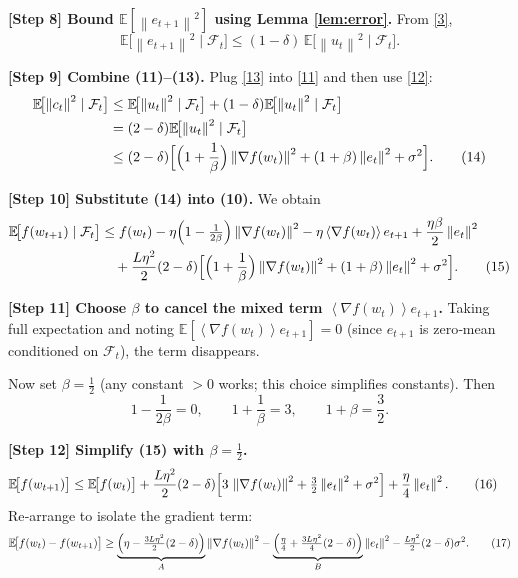 \documentclass{article}
\newcommand{\E}{\mathbb{E}}
\newcommand{\norm}[1]{\left\|#1\right\|}
\newcommand{\inner}[1]{\left\langle#1\right\rangle}
\begin{document}
\noindent\textbf{[Step 8] Bound $\E[\norm{e_{t+1}}^2]$ using Lemma \ref{lem:error}.}  
From \eqref{3},
\[
\E\!\bigl[\norm{e_{t+1}}^2\mid\mathcal{F}_t\bigr]\le (1-\delta)\,\E\!\bigl[\norm{u_t}^2\mid\mathcal{F}_t\bigr] .
\tag{13}
\]

\noindent\textbf{[Step 9] Combine (11)–(13).}  
Plug \eqref{13} into \eqref{11} and then use \eqref{12}:
\begin{align}
\E\!\bigl[\norm{c_t}^2\mid\mathcal{F}_t\bigr]
&\le \E\!\bigl[\norm{u_t}^2\mid\mathcal{F}_t\bigr]
   + (1-\delta)\E\!\bigl[\norm{u_t}^2\mid\mathcal{F}_t\bigr] \nonumber\\
&= (2-\delta)\E\!\bigl[\norm{u_t}^2\mid\mathcal{F}_t\bigr] \nonumber\\
&\le (2-\delta)\Bigl[\Bigl(1+\frac{1}{\beta}\Bigr)\norm{\nabla f(w_t)}^2
   + (1+\beta)\norm{e_t}^2 + \sigma^2\Bigr] .
\tag{14}
\end{align}

\noindent\textbf{[Step 10] Substitute (14) into (10).}  
We obtain
\begin{align}
\E\!\bigl[f(w_{t+1})\mid\mathcal{F}_t\bigr]
&\le f(w_t)-\eta\Bigl(1-\tfrac{1}{2\beta}\Bigr)\norm{\nabla f(w_t)}^2
   -\eta\inner{\nabla f(w_t)}{e_{t+1}}
   +\frac{\eta\beta}{2}\norm{e_t}^2  \nonumber\\
&\quad +\frac{L\eta^2}{2}(2-\delta)
   \Bigl[\Bigl(1+\frac{1}{\beta}\Bigr)\norm{\nabla f(w_t)}^2
   + (1+\beta)\norm{e_t}^2 + \sigma^2\Bigr] .
\tag{15}
\end{align}

\noindent\textbf{[Step 11] Choose $\beta$ to cancel the mixed term $\inner{\nabla f(w_t)}{e_{t+1}}$.}  
Taking full expectation and noting $\E[\inner{\nabla f(w_t)}{e_{t+1}}]=0$ (since $e_{t+1}$ is zero‑mean conditioned on $\mathcal{F}_t$), the term disappears.  

Now set $\beta = \frac{1}{2}$ (any constant $>0$ works; this choice simplifies constants). Then
\[
1-\frac{1}{2\beta}=0,\qquad
1+\frac{1}{\beta}=3,\qquad
1+\beta=\frac{3}{2}.
\]

\noindent\textbf{[Step 12] Simplify (15) with $\beta=\tfrac12$.}  
\begin{align}
\E\!\bigl[f(w_{t+1})\bigr]
&\le \E\!\bigl[f(w_t)\bigr]
   +\frac{L\eta^2}{2}(2-\delta)
   \Bigl[3\,\norm{\nabla f(w_t)}^2
   +\tfrac{3}{2}\norm{e_t}^2 + \sigma^2\Bigr]
   +\frac{\eta}{4}\norm{e_t}^2 .
\tag{16}
\end{align}
Re‑arrange to isolate the gradient term:
\[
\E\!\bigl[f(w_t)-f(w_{t+1})\bigr]
\ge \underbrace{\Bigl( \eta - \tfrac{3L\eta^2}{2}(2-\delta) \Bigr)}_{A}
        \norm{\nabla f(w_t)}^2
     -\underbrace{\Bigl(\tfrac{\eta}{4}
        +\tfrac{3L\eta^2}{4}(2-\delta)\Bigr)}_{B}\norm{e_t}^2
     -\tfrac{L\eta^2}{2}(2-\delta)\sigma^2 .
\tag{17}
\]
\end{document}
